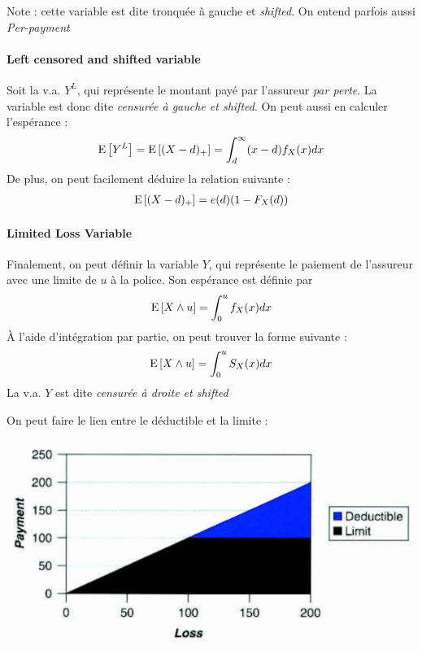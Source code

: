 \documentclass[12pt, french]{report}
\begin{document}
Note : cette variable est dite tronquée à gauche et \textit{shifted}. On entend parfois aussi \textit{Per-payment}
	

\paragraph{Left censored and shifted variable}
Soit la v.a. $Y^L$, qui représente le montant payé par l'assureur \textit{par perte}. La variable est donc dite \textit{censurée à gauche et shifted}. On peut aussi en calculer l'espérance : 
\begin{equation}
\mathrm{E} \left[ Y^L \right] = \mathrm{E} \left[ (X-d)_+ \right] = \int_{d}^{\infty} (x-d) f_X(x) dx
\end{equation}
De plus, on peut facilement déduire la relation suivante : 
\begin{align*}
\mathrm{E} \left[ (X-d)_+ \right] = e(d) (1 - F_X(d))
\end{align*}

\paragraph{Limited Loss Variable} Finalement, on peut définir la variable $Y$, qui représente le paiement de l'assureur avec une limite de $u$ à la police. Son espérance est définie par
\begin{equation}
\mathrm{E} \left[ X \wedge u \right] = \int_{0}^{u} f_X(x) dx
\end{equation}
À l'aide d'intégration par partie, on peut trouver la forme suivante : 
\begin{align*}
\mathrm{E} \left[ X \wedge u \right] = \int_{0}^{u} S_X(x) dx
\end{align*}
La v.a. $Y$ est dite \textit{censurée à droite et shifted}

\begin{exemple}
On peut faire le lien entre le déductible et la limite : 
\begin{center}
\includegraphics[scale=0.45]{Figures/distinction_loss-deductible-limit}
\end{center}
\end{exemple}
\end{document}
